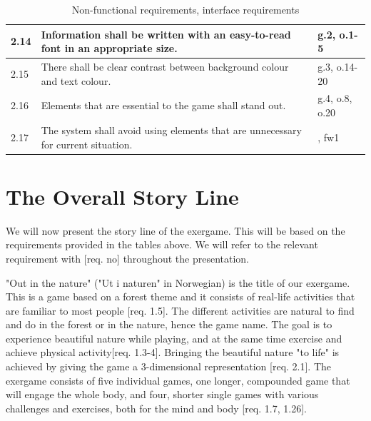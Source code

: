 \begin{table} [H]
\centering
\begin{tabular}{|>{\raggedright}p{}|p{}|p{}|} 
\hline
2.14 & Information shall be written with an easy-to-read font in an appropriate size. &  g.2, o.1-5\\ \hline
2.15 & There shall be clear contrast between background colour and text colour. & g.3, o.14-20 \\ \hline
2.16 & Elements that are essential to the game shall stand out. & g.4, o.8, o.20\\ \hline
2.17 & The system shall avoid using elements that are unnecessary for current situation.  & \cite{sweetser}, fw1\\ \hline
\end{tabular}
\caption[Non-functional requirements, part 2]{Non-functional requirements, interface requirements}
\label{tab:nonfunc2}
\end{table} 

\section{The Overall Story Line}
\label{sec:outinthenature}
We will now present the story line of the exergame. This will be based on the requirements provided in the tables above. We will refer to the relevant requirement with [req. no] throughout the presentation. 

"Out in the nature" ("Ut i naturen" in Norwegian) is the title of our exergame. This is a game based on a forest theme and it consists of real-life activities that are familiar to most people [req. 1.5]. The different activities are natural to find and do in the forest or in the nature, hence the game name. The goal is to experience beautiful nature while playing, and at the same time exercise and achieve physical activity[req. 1.3-4]. Bringing the beautiful nature "to life" is achieved by giving the game a 3-dimensional representation [req. 2.1]. The exergame consists of five individual games, one longer, compounded game that will engage the whole body, and four, shorter single games with various challenges and exercises, both for the mind and body [req. 1.7, 1.26].        

